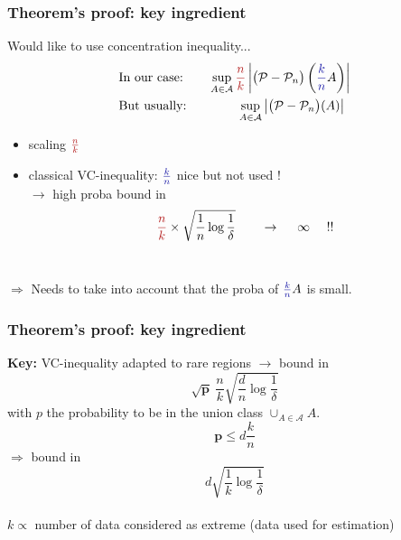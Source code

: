 \documentclass[9pt]{beamer}
\newcommand\red{\color{red} }
\newcommand\blue{\color{blue} }
\def\mb{\mathbf}
\begin{document}
\begin{frame}
\frametitle{Theorem's proof: key ingredient}
Would like to use concentration inequality... %
\begin{align*}
&\text{In our case:~~~~~~} \sup_{A \in \mathcal{A}} {\red\frac{n}{k}}\left| \big(\mathcal{P}- \mathcal{P}_n\big)\left({\blue \frac{k}{n}}A\right)\right|\\
&\text{But usually:~~~~~~~~~~~~} \sup_{A \in \mathcal{A}} \left| \big(\mathcal{P}-\mathcal{P}_n\big)(A) \right|
\end{align*}
\begin{itemize}
\item scaling ${\red \frac{n}{k}}$%
\item classical VC-inequality: ${\blue \frac{k}{n}}$ nice but not used ! \\$\rightarrow $ high proba bound in $${\red \frac{n}{k}} \times  \sqrt{ \frac{1}{ n}\log \frac{1}{\delta}} ~~~~~~\to~~ ~~\infty~~~~ !! $$ \\
\end{itemize}

$\Rightarrow$ Needs to take into account that the proba of  ${\blue \frac{k}{n}}A$ is small.\\
\end{frame}


\begin{frame}
\frametitle{Theorem's proof: key ingredient}
\textbf{Key:}
VC-inequality adapted to rare regions $\rightarrow$ bound in $$\mathbf{\sqrt{p}}~ \frac{n}{k} \sqrt{ \frac{d}{ n}\log \frac{1}{\delta}}$$
with $p$ the probability to be in the union class $\cup_{A \in \mathcal{A}}A$.
$$\mb p \le d \frac{k}{n}$$
$\Rightarrow$ bound in $$ d \sqrt{ \frac{1}{ k}\log \frac{1}{\delta}} $$
~\\
$k \propto$ number of data considered as extreme (data used for estimation)

\end{frame}
\end{document}
